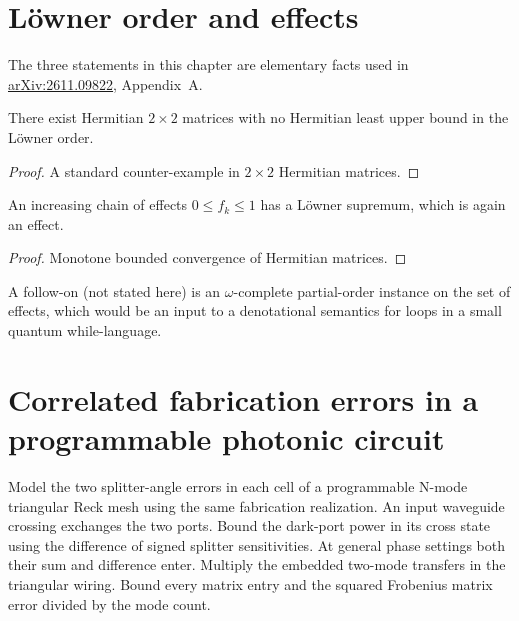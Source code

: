 \chapter{L\"owner order and effects}

The three statements in this chapter are elementary facts used in
\href{https://arxiv.org/abs/2611.09822}{arXiv:2611.09822}, Appendix~A.

\begin{theorem}
  \label{thm:loewner_not_lattice}
  There exist Hermitian $2\times 2$ matrices with no Hermitian least upper bound
  in the L\"owner order.
\end{theorem}

\begin{proof}
  A standard counter-example in $2\times 2$ Hermitian matrices.
\end{proof}

\begin{theorem}
  \label{thm:loewner_chain_sup}
  An increasing chain of effects $0\le f_k\le 1$ has a L\"owner supremum, which
  is again an effect.
\end{theorem}

\begin{proof}
  Monotone bounded convergence of Hermitian matrices.
\end{proof}

A follow-on (not stated here) is an $\omega$-complete partial-order instance on
the set of effects, which would be an input to a denotational semantics for
loops in a small quantum while-language.

\chapter{Correlated fabrication errors in a programmable photonic circuit}

\begin{theorem}
  \label{thm:sandia_correlated_mzi_mesh}
Model the two splitter-angle errors in each cell of a programmable N-mode triangular Reck mesh using the same fabrication realization. An input waveguide crossing exchanges the two ports. Bound the dark-port power in its cross state using the difference of signed splitter sensitivities. At general phase settings both their sum and difference enter. Multiply the embedded two-mode transfers in the triangular wiring. Bound every matrix entry and the squared Frobenius matrix error divided by the mode count.
\end{theorem}

